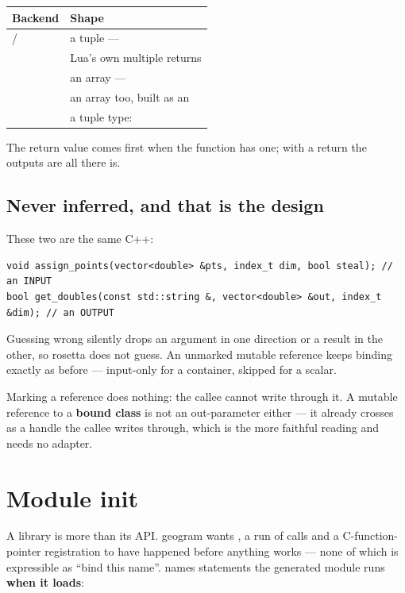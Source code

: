 \begin{center}
\small
\begin{tabular}{@{}lL{8.6cm}@{}}
\toprule
\textbf{Backend} & \textbf{Shape} \\
\midrule
{} /  & a tuple ---  \\
        & Lua's own multiple returns \\
       & an array ---  \\
       & an array too, built as an  \\
 & a tuple type:  \\
\bottomrule
\end{tabular}
\end{center}

The return value comes first when the function has one; with a 
return the outputs are all there is.

\subsection*{Never inferred, and that is the design}

These two are the same C++:

\begin{lstlisting}[style=cpp]
void assign_points(vector<double> &pts, index_t dim, bool steal); // an INPUT
bool get_doubles(const std::string &, vector<double> &out, index_t &dim); // an OUTPUT
\end{lstlisting}

Guessing wrong silently drops an argument in one direction or a result in the
other, so rosetta does not guess. An unmarked mutable reference keeps binding
exactly as before --- input-only for a container, skipped for a scalar.

Marking a  reference does nothing: the callee cannot write through
it. A mutable reference to a \textbf{bound class} is not an out-parameter
either --- it already crosses as a handle the callee writes through, which is
the more faithful reading and needs no adapter.

\section{Module init}
\label{sec:moduleinit}

A library is more than its API. geogram wants , a run of
 calls and a C-function-pointer registration
to have happened before anything works --- none of which is expressible as
``bind this name''.  names statements the generated module
runs \textbf{when it loads}:

